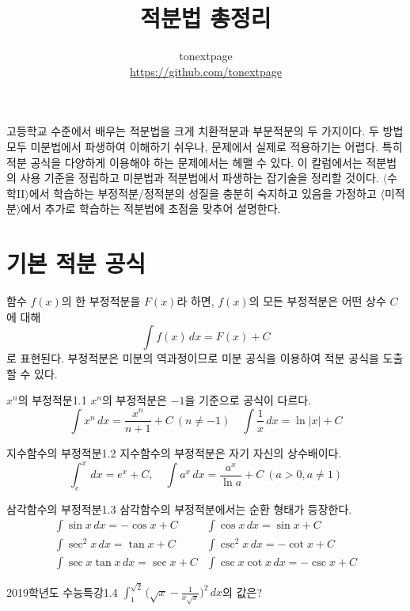 \documentclass{article}
\title{적분법 총정리}
\author{tonextpage\\
    \url{https://github.com/tonextpage}
}
\date{}
\begin{document}
\maketitle

\noindent 고등학교 수준에서 배우는 적분법을 크게 치환적분과 부분적분의 두 가지이다. 두 방법 모두 미분법에서 파생하여 이해하기 쉬우나, 문제에서 실제로 적용하기는 어렵다. 특히 적분 공식을 다양하게 이용해야 하는 문제에서는 헤맬 수 있다. 이 칼럼에서는 적분법의 사용 기준을 정립하고 미분법과 적분법에서 파생하는 잡기술을 정리할 것이다. $\langle$수학II$\rangle$에서 학습하는 부정적분/정적분의 성질을 충분히 숙지하고 있음을 가정하고 $\langle$미적분$\rangle$에서 추가로 학습하는 적분법에 초점을 맞추어 설명한다.

\section{기본 적분 공식}
함수 $f(x)$의 한 부정적분을 $F(x)$라 하면, $f(x)$의 모든 부정적분은 어떤 상수 $C$에 대해
\[
	\int f(x)\,dx=F(x)+C
\]
로 표현된다. 부정적분은 미분의 역과정이므로 미분 공식을 이용하여 적분 공식을 도출할 수 있다.

\begin{thm}{$x^n$의 부정적분}{1.1}
	$x^n$의 부정적분은 $-1$을 기준으로 공식이 다르다.
	\[
		\int x^n\,dx=\frac{x^n}{n+1}+C~(n\ne-1)\quad\int\frac{1}{x}\,dx=\ln\vert x\vert+C
	\]
\end{thm}

\begin{thm}{지수함수의 부정적분}{1.2}
	지수함수의 부정적분은 자기 자신의 상수배이다.
	\[
		\int_e^x\,dx=e^x+C,\quad\int a^x\,dx=\frac{a^x}{\ln a}+C~(a>0,a\ne1)
	\]
\end{thm}

\begin{thm}{삼각함수의 부정적분}{1.3}
	삼각함수의 부정적분에서는 순환 형태가 등장한다.
	\[
		\begin{array}{ll}
			\displaystyle\int\sin x\,dx=-\cos x+C & \displaystyle\int\cos x\,dx=\sin x+C \\[9pt]
			\displaystyle\int\sec^2x\,dx=\tan x+C & \displaystyle\int \csc^2x\,dx=-\cot x+C \\[9pt]
			\displaystyle\int\sec x\tan x\,dx=\sec x+C & \displaystyle\int\csc x\cot x\,dx=-\csc x+C
		\end{array}
	\]
\end{thm}

\begin{exc}{2019학년도 수능특강}{1.4}
	$\displaystyle\int_1^{\sqrt2}\biggl(\sqrt x-\frac{1}{x\sqrt x}\biggr)^2\,dx$의 값은?
\end{exc}
\end{document}

